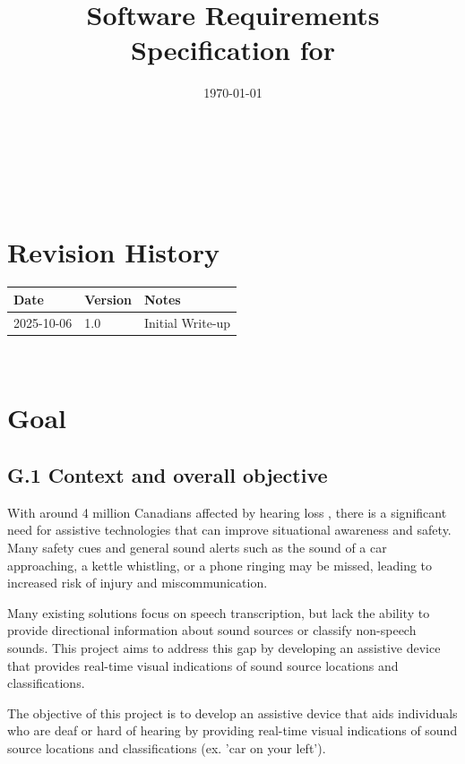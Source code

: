 \documentclass[12pt]{article}
\theoremstyle{definition}
\begin{document}
\title{Software Requirements Specification for \progname} 
\author{\authname}
\date{\today}
	
\maketitle

~\newpage


\tableofcontents

~\newpage

\section*{Revision History}


\begin{tabularx}{\textwidth}{p{3cm}p{2cm}X}
\toprule {\bf Date} & {\bf Version} & {\bf Notes}\\
\midrule
2025-10-06 & 1.0 & Initial Write-up\\
\bottomrule
\end{tabularx}


~\newpage

\section{Goal}

\subsection{G.1 Context and overall objective}

With around 4 million Canadians affected by hearing loss \cite{Healthing2025}, 
there is a significant need for assistive technologies that can improve 
situational awareness and safety.
Many safety cues and general sound alerts such as the sound of a car 
approaching, a kettle whistling,
or a phone ringing may be missed, leading to increased risk of injury and
miscommunication.

Many existing solutions focus on speech transcription, but lack the ability to
provide directional information about sound sources or classify non-speech
sounds. This project aims to address this gap by developing an assistive device
that provides real-time visual indications of sound source locations and 
classifications.

The objective of this project is to develop an assistive device that aids
individuals who are deaf or hard of hearing by providing real-time visual
indications of sound source locations and classifications (ex. 'car on your 
left').
\end{document}
